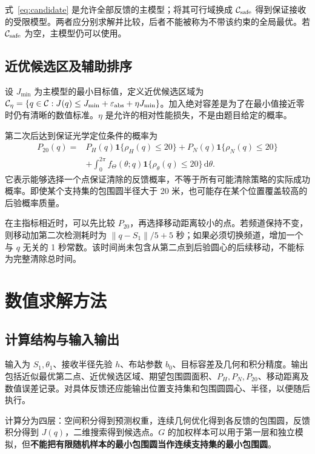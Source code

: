 \documentclass[UTF8,a4paper,zihao=-4,fontset=none]{ctexart}
\numberwithin{equation}{section}
\theoremstyle{definition}
\newcommand{\ind}{\mathbf 1}
\newcommand{\dd}{\,\mathrm d}
\newcommand{\norm}[1]{\left\lVert #1\right\rVert}
\begin{document}
式~\eqref{eq:candidate} 是允许全部反馈的主模型；将其可行域换成 \(\mathcal C_{\rm safe}\) 得到保证接收的受限模型。两者应分别求解并比较，后者不能被称为不带该约束的全局最优。若 \(\mathcal C_{\rm safe}\) 为空，主模型仍可以使用。

\subsection{近优候选区及辅助排序}
设 \(J_{\min}\) 为主模型的最小目标值，定义近优候选区域为 \(\mathcal C_\eta=\{q\in\mathcal C:J(q)\le J_{\min}+\varepsilon_{\rm abs}+\eta J_{\min}\}\)。加入绝对容差是为了在最小值接近零时仍有清晰的数值标准。\(\eta\) 是允许的相对性能损失，不是由题目给定的概率。

第二次后达到保证光学定位条件的概率为
\begin{equation}\label{eq:p20}
\begin{aligned}
P_{20}(q)={}&P_H(q)\ind\{\rho_H(q)\le20\}
+P_N(q)\ind\{\rho_N(q)\le20\}\\
&+\int_0^{2\pi}f_\Theta(\theta;q)\ind\{\rho_\theta(q)\le20\}\dd\theta.
\end{aligned}
\end{equation}
它表示能够选择一个点保证清除的反馈概率，不等于所有可能清除策略的实际成功概率。即使某个支持集的包围圆半径大于 20 米，也可能存在某个位置覆盖较高的后验概率质量。

在主指标相近时，可以先比较 \(P_{20}\)，再选择移动距离较小的点。若频道保持不变，则移动加第二次检测耗时为 \(\norm{q-S_1}/5+5\) 秒；如果必须切换频道，增加一个与 \(q\) 无关的 1 秒常数。该时间尚未包含从第二点到后验圆心的后续移动，不能标为完整清除总时间。

\section{数值求解方法}
\subsection{计算结构与输入输出}
输入为 \(S_1,\theta_1\)、接收半径先验 \(h\)、布站参数 \(b_0\)、目标容差及几何和积分精度。输出包括近似最优第二点、近优候选区域、期望包围圆面积、\(P_H,P_N,P_{20}\)、移动距离及数值误差记录。对具体反馈还应能输出位置支持集和包围圆圆心、半径，以便随后执行。

计算分为四层：空间积分得到预测权重，连续几何优化得到各反馈的包围圆，反馈积分得到 \(J(q)\)，二维搜索得到候选点。\(G\) 的加权样本可以用于第一层和独立模拟，但\textbf{不能把有限随机样本的最小包围圆当作连续支持集的最小包围圆}。
\end{document}
